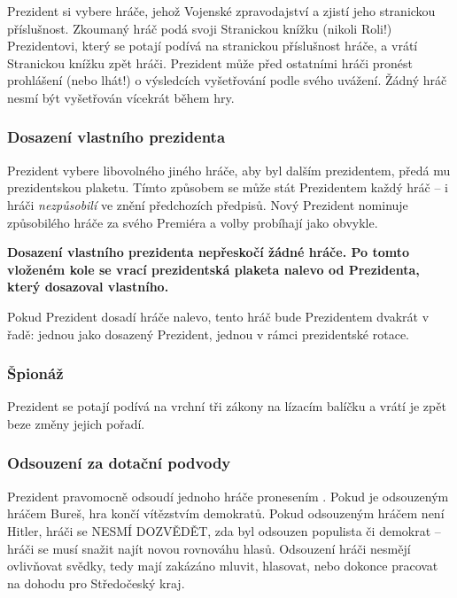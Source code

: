 \documentclass{article}
\begin{document}
            Prezident si vybere hráče, jehož  Vojenské zpravodajství a zjistí jeho stranickou příslušnost. Zkoumaný hráč podá svoji Stranickou knížku (nikoli Roli!) %
            Prezidentovi, který se potají podívá na stranickou příslušnost hráče, a vrátí Stranickou knížku zpět hráči. Prezident může před ostatními hráči pronést prohlášení (nebo lhát!) o výsledcích vyšetřování podle svého uvážení. Žádný hráč nesmí být vyšetřován vícekrát během hry.

        \subsubsection*{Dosazení vlastního prezidenta}

            Prezident vybere libovolného jiného hráče, aby byl dalším prezidentem, předá mu prezidentskou plaketu. Tímto způsobem se může stát Prezidentem každý hráč -- i hráči {\it nezpůsobilí} ve znění předchozích předpisů. Nový Prezident nominuje způsobilého hráče za svého Premiéra a volby probíhají jako obvykle.

            \textbf{Dosazení vlastního prezidenta nepřeskočí žádné hráče. Po tomto vloženém kole se vrací prezidentská plaketa nalevo od Prezidenta, který dosazoval vlastního.}

            Pokud Prezident dosadí hráče nalevo, tento hráč bude Prezidentem dvakrát v řadě: jednou jako dosazený Prezident, jednou v rámci prezidentské rotace.

        \subsubsection*{Špionáž}

            Prezident se potají podívá na vrchní tři zákony na lízacím balíčku a vrátí je zpět beze změny jejich pořadí.

        \subsubsection*{Odsouzení za dotační podvody}

            Prezident pravomocně odsoudí jednoho hráče pronesením . Pokud je odsouzeným hráčem Bureš, hra končí vítězstvím demokratů. Pokud odsouzeným hráčem není Hitler, hráči se NESMÍ DOZVĚDĚT, zda byl odsouzen populista či demokrat -- hráči se musí snažit najít novou rovnováhu hlasů. Odsouzení hráči nesmějí ovlivňovat svědky, tedy mají zakázáno mluvit, hlasovat, nebo dokonce pracovat na dohodu pro Středočeský kraj. %
\end{document}
